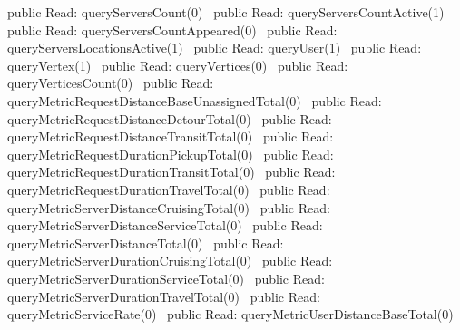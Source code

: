 public \LA{}Read: queryServersCount(0)~{\nwtagstyle{}}\RA{}
public \LA{}Read: queryServersCountActive(1)~{\nwtagstyle{}}\RA{}
public \LA{}Read: queryServersCountAppeared(0)~{\nwtagstyle{}}\RA{}
public \LA{}Read: queryServersLocationsActive(1)~{\nwtagstyle{}}\RA{}
public \LA{}Read: queryUser(1)~{\nwtagstyle{}}\RA{}
public \LA{}Read: queryVertex(1)~{\nwtagstyle{}}\RA{}
public \LA{}Read: queryVertices(0)~{\nwtagstyle{}}\RA{}
public \LA{}Read: queryVerticesCount(0)~{\nwtagstyle{}}\RA{}
\nwendcode{}\nwdocspar
{}
\nwenddocs{}\plusendmoddef
public \LA{}Read: queryMetricRequestDistanceBaseUnassignedTotal(0)~{\nwtagstyle{}}\RA{}
public \LA{}Read: queryMetricRequestDistanceDetourTotal(0)~{\nwtagstyle{}}\RA{}
public \LA{}Read: queryMetricRequestDistanceTransitTotal(0)~{\nwtagstyle{}}\RA{}
public \LA{}Read: queryMetricRequestDurationPickupTotal(0)~{\nwtagstyle{}}\RA{}
public \LA{}Read: queryMetricRequestDurationTransitTotal(0)~{\nwtagstyle{}}\RA{}
public \LA{}Read: queryMetricRequestDurationTravelTotal(0)~{\nwtagstyle{}}\RA{}
public \LA{}Read: queryMetricServerDistanceCruisingTotal(0)~{\nwtagstyle{}}\RA{}
public \LA{}Read: queryMetricServerDistanceServiceTotal(0)~{\nwtagstyle{}}\RA{}
public \LA{}Read: queryMetricServerDistanceTotal(0)~{\nwtagstyle{}}\RA{}
public \LA{}Read: queryMetricServerDurationCruisingTotal(0)~{\nwtagstyle{}}\RA{}
public \LA{}Read: queryMetricServerDurationServiceTotal(0)~{\nwtagstyle{}}\RA{}
public \LA{}Read: queryMetricServerDurationTravelTotal(0)~{\nwtagstyle{}}\RA{}
public \LA{}Read: queryMetricServiceRate(0)~{\nwtagstyle{}}\RA{}
public \LA{}Read: queryMetricUserDistanceBaseTotal(0)~{\nwtagstyle{}}\RA{}
\nwendcode{}\nwdocspar
{}
\nwenddocs{}\plusendmoddef
